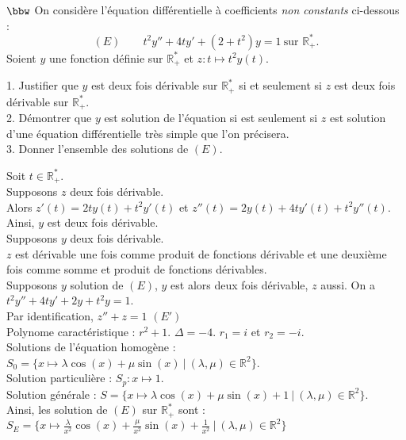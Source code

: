 \documentclass[11pt]{article}
\begin{document}
\begin{exercice}{$\bbw$}{}
    On considère l'équation différentielle à coefficients \emph{non constants} ci-dessous :
    \begin{equation*}
        (E) \qquad t^2y'' + 4ty' + (2 + t^2)y = 1 ~ \text{sur }\mathbb{R}^*_+.
    \end{equation*}
    Soient $y$ une fonction définie sur $\mathbb{R}^*_+$ et $z:t\mapsto t^2y(t)$.
    \begin{adjustwidth}{0.2cm}{}
        1. Justifier que $y$ est deux fois dérivable sur $\mathbb{R}^*_+$ si et seulement si $z$ est deux fois dérivable sur $\mathbb{R}^*_+$.\\
        2. Démontrer que $y$ est solution de l'équation si est seulement si $z$ est solution d'une équation différentielle très simple que l'on précisera.\\
        3. Donner l'ensemble des solutions de $(E)$.
    \end{adjustwidth}
    \tcblower
     Soit $t\in\mathbb{R}^*_+$.\\ 
    Supposons $z$ deux fois dérivable.\\
    Alors $z'(t) = 2ty(t) + t^2y'(t)$ et $z''(t) = 2y(t) + 4ty'(t) + t^2y''(t)$.\\
    Ainsi, $y$ est deux fois dérivable.\\[0.1cm]
    Supposons $y$ deux fois dérivable.\\
    $z$ est dérivable une fois comme produit de fonctions dérivable et une deuxième fois comme somme et produit de fonctions dérivables.\\[0.2cm]
     Supposons $y$ solution de $(E)$, $y$ est alors deux fois dérivable, $z$ aussi. On a $t^2y'' + 4ty' + 2y+t^2y=1$.\\
    Par identification, $z'' + z = 1$ $(E')$\\[0.2cm]
     Polynome caractéristique : $r^2 + 1$. $\Delta = -4$. $r_1 = i$ et $r_2 = -i$.\\
    Solutions de l'équation homogène : $S_0 = \{x\mapsto \lambda\cos(x) + \mu\sin(x) ~ | ~ (\lambda, \mu)\in\mathbb{R}^2\}$.\\
    Solution particulière : $S_p : x\mapsto 1$.\\
    Solution générale : $S = \{x\mapsto \lambda \cos(x) + \mu \sin(x) + 1 ~ | ~ (\lambda, \mu) \in \mathbb{R}^2\}$.\\
    Ainsi, les solution de $(E)$ sur $\mathbb{R}^*_+$ sont : $S_E = \{x\mapsto \frac{\lambda}{x^2}\cos(x) + \frac{\mu}{x^2}\sin(x) + \frac{1}{x^2} ~ | ~ (\lambda, \mu)\in\mathbb{R}^2\}$
\end{exercice}
\end{document}
